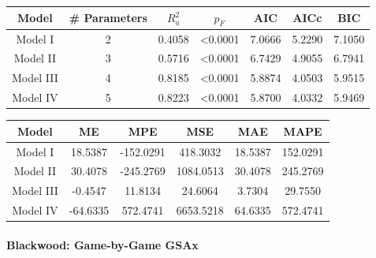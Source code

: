 \documentclass[
  10pt,
]{extarticle}
\begin{document}
\begin{center}
\normalsize

\begin{tabular}{ccccccc}
\toprule
Model & \# Parameters & $R_a^2$ & $p_F$ & AIC & AICc & BIC\\
\midrule
Model I & 2 & 0.4058 & <0.0001 & 7.0666 & 5.2290 & 7.1050\\
Model II & 3 & 0.5716 & <0.0001 & 6.7429 & 4.9055 & 6.7941\\
Model III & 4 & 0.8185 & <0.0001 & 5.8874 & 4.0503 & 5.9515\\
Model IV & 5 & 0.8223 & <0.0001 & 5.8700 & 4.0332 & 5.9469\\
\bottomrule
\end{tabular}
\normalsize
\end{center}
\begin{center}
\normalsize

\begin{tabular}{cccccc}
\toprule
Model & ME & MPE & MSE & MAE & MAPE\\
\midrule
Model I & 18.5387 & -152.0291 & 418.3032 & 18.5387 & 152.0291\\
Model II & 30.4078 & -245.2769 & 1084.0513 & 30.4078 & 245.2769\\
Model III & -0.4547 & 11.8134 & 24.6064 & 3.7304 & 29.7550\\
Model IV & -64.6335 & 572.4741 & 6653.5218 & 64.6335 & 572.4741\\
\bottomrule
\end{tabular}
\normalsize
\end{center}

\paragraph{Blackwood: Game-by-Game GSAx}\label{blackwood-game-by-game-gsax}
\end{document}

